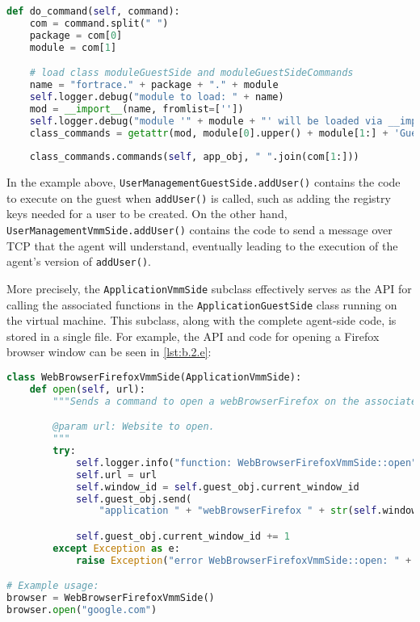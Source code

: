 \begin{lstlisting}[label={lst:b.2.d}, caption={Demonstration of ForTrace agent module discovery and command execution}, language=Python]
def do_command(self, command):
    com = command.split(" ")
    package = com[0]
    module = com[1]

    # load class moduleGuestSide and moduleGuestSideCommands
    name = "fortrace." + package + "." + module
    self.logger.debug("module to load: " + name)
    mod = __import__(name, fromlist=[''])
    self.logger.debug("module '" + module + "' will be loaded via __import__")
    class_commands = getattr(mod, module[0].upper() + module[1:] + 'GuestSideCommands')
    
    class_commands.commands(self, app_obj, " ".join(com[1:]))
\end{lstlisting}

In the example above,
\passthrough{\lstinline!UserManagementGuestSide.addUser()!} contains the
code to execute on the guest when \passthrough{\lstinline!addUser()!} is
called, such as adding the registry keys needed for a user to be
created. On the other hand,
\passthrough{\lstinline!UserManagementVmmSide.addUser()!} contains the
code to send a message over TCP that the agent will understand,
eventually leading to the execution of the agent's version of
\passthrough{\lstinline!addUser()!}.

More precisely, the \passthrough{\lstinline!ApplicationVmmSide!}
subclass effectively serves as the API for calling the associated
functions in the \passthrough{\lstinline!ApplicationGuestSide!} class
running on the virtual machine. This subclass, along with the complete
agent-side code, is stored in a single file. For example, the API and
code for opening a Firefox browser window can be seen in
\autoref{lst:b.2.e}:

\begin{lstlisting}[label={lst:b.2.e}, caption={Sample ForTrace agent API implementation}, language=Python]
class WebBrowserFirefoxVmmSide(ApplicationVmmSide):
    def open(self, url):
        """Sends a command to open a webBrowserFirefox on the associated guest.

        @param url: Website to open.
        """
        try:
            self.logger.info("function: WebBrowserFirefoxVmmSide::open")
            self.url = url
            self.window_id = self.guest_obj.current_window_id
            self.guest_obj.send(
                "application " + "webBrowserFirefox " + str(self.window_id) + " open " + self.webBrowserFirefox + " " + self.url)

            self.guest_obj.current_window_id += 1
        except Exception as e:
            raise Exception("error WebBrowserFirefoxVmmSide::open: " + str(e))

# Example usage:
browser = WebBrowserFirefoxVmmSide()
browser.open("google.com")
\end{lstlisting}

